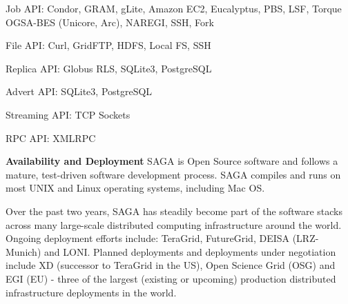 \documentclass[a0b,portrait]{a0poster}
\begin{document}
\begin{textblock}{7}
\begin{list}{}{\leftmargin=1.6em}
\item{Job API: Condor, GRAM, gLite, Amazon EC2, Eucalyptus, PBS, LSF, Torque
OGSA-BES (Unicore, Arc), NAREGI, SSH, Fork}
\item{File API: Curl, GridFTP, HDFS, Local FS, SSH} 
\item{Replica API: Globus RLS, SQLite3, PostgreSQL}
\item{Advert API: SQLite3, PostgreSQL} 
\item{Streaming API: TCP Sockets} 
\item{RPC API: XMLRPC} 
\end{list}

\textbf{\color{DarkBlue} Availability and Deployment } SAGA is Open Source
software and follows a mature, test-driven software development process. SAGA
compiles and runs on most UNIX and Linux operating systems, including Mac OS.

Over the past two years, SAGA has steadily become part of the software
stacks across many large-scale distributed computing infrastructure
around the world. Ongoing deployment efforts include: TeraGrid,
FutureGrid, DEISA (LRZ-Munich) and LONI.  Planned deployments and
deployments under negotiation include XD (successor to TeraGrid in the
US), Open Science Grid (OSG) and EGI (EU) - three of the largest
(existing or upcoming) production distributed infrastructure
deployments in the world.



\end{textblock}
\end{document}

